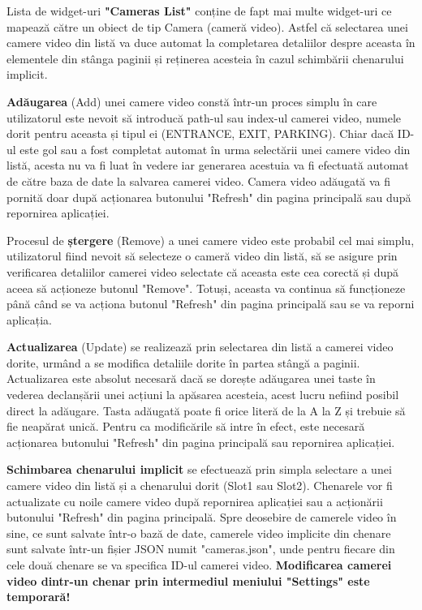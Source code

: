 \documentclass[12pt]{article}
\begin{document}
Lista de widget-uri \textbf{"Cameras List"} conține de fapt mai multe widget-uri ce mapeaz\u{a} c\u{a}tre un obiect de tip Camera (camer\u{a} video). Astfel c\u{a} selectarea unei camere video din list\u{a} va duce automat la completarea detaliilor despre aceasta \^{i}n elementele din st\^{a}nga paginii și reținerea acesteia \^{i}n cazul schimb\u{a}rii chenarului implicit.

\textbf{Ad\u{a}ugarea} (Add) unei camere video const\u{a} \^{i}ntr-un proces simplu \^{i}n care utilizatorul este nevoit s\u{a} introduc\u{a} path-ul sau index-ul camerei video, numele dorit pentru aceasta și tipul ei (ENTRANCE, EXIT, PARKING). Chiar dac\u{a} ID-ul este gol sau a fost completat automat \^{i}n urma select\u{a}rii unei camere video din list\u{a}, acesta nu va fi luat \^{i}n vedere iar generarea acestuia va fi efectuat\u{a} automat de c\u{a}tre baza de date la salvarea camerei video. Camera video ad\u{a}ugat\u{a} va fi pornit\u{a} doar dup\u{a} acționarea butonului "Refresh" din pagina principal\u{a} sau dup\u{a} repornirea aplicației.

Procesul de \textbf{ștergere} (Remove) a unei camere video este probabil cel mai simplu, utilizatorul fiind nevoit s\u{a} selecteze o camer\u{a} video din list\u{a}, s\u{a} se asigure prin verificarea detaliilor camerei video selectate c\u{a} aceasta este cea corect\u{a} și dup\u{a} aceea s\u{a} acționeze butonul "Remove". Totuși, aceasta va continua s\u{a} funcționeze p\^{a}n\u{a} c\^{a}nd se va acționa butonul "Refresh" din pagina principal\u{a} sau se va reporni aplicația.

\textbf{Actualizarea} (Update) se realizeaz\u{a} prin selectarea din list\u{a} a camerei video dorite, urm\^{a}nd a se modifica detaliile dorite \^{i}n partea st\^{a}ng\u{a} a paginii. Actualizarea este absolut necesar\u{a} dac\u{a} se dorește ad\u{a}ugarea unei taste \^{i}n vederea declanș\u{a}rii unei acțiuni la ap\u{a}sarea acesteia, acest lucru nefiind posibil direct la ad\u{a}ugare. Tasta ad\u{a}ugat\u{a} poate fi orice liter\u{a} de la A la Z și trebuie s\u{a} fie neap\u{a}rat unic\u{a}. Pentru ca modific\u{a}rile s\u{a} intre \^{i}n efect, este necesar\u{a} acționarea butonului "Refresh" din pagina principal\u{a} sau repornirea aplicației.

\textbf{Schimbarea chenarului implicit} se efectueaz\u{a} prin simpla selectare a unei camere video din list\u{a} și a chenarului dorit (Slot1 sau Slot2). Chenarele vor fi actualizate cu noile camere video dup\u{a} repornirea aplicației sau a acțion\u{a}rii butonului "Refresh" din pagina principal\u{a}. Spre deosebire de camerele video \^{i}n sine, ce sunt salvate \^{i}ntr-o baz\u{a} de date, camerele video implicite din chenare sunt salvate \^{i}ntr-un fișier JSON numit "cameras.json", unde pentru fiecare din cele dou\u{a} chenare se va specifica ID-ul camerei video. \textbf{Modificarea camerei video dintr-un chenar prin intermediul meniului "Settings" este temporar\u{a}!}
\end{document}
